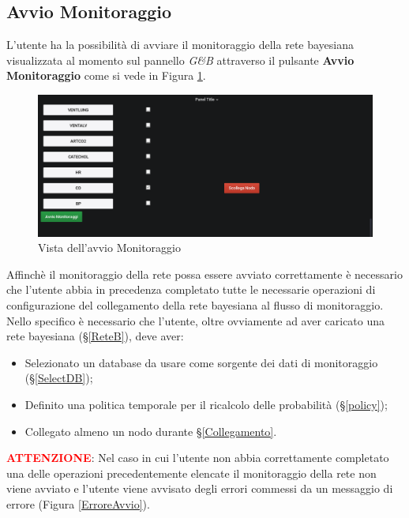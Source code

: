\subsection{Avvio Monitoraggio}\label{Avvio}

L'utente ha la possibilità di avviare il monitoraggio della rete bayesiana visualizzata al momento sul pannello \textit{G\&B} attraverso il pulsante \textbf{Avvio Monitoraggio} come si vede in Figura \ref{AvvioMonitoraggio}.

\begin{figure}[H]
	\begin{center}
		\includegraphics[scale=0.4]{./images/AvvioMonitoraggio.png}
		 \caption{Vista dell'avvio Monitoraggio}	
		 \label{AvvioMonitoraggio}
	\end{center}
\end{figure}

Affinchè il monitoraggio della rete possa essere avviato correttamente è necessario che l'utente abbia in precedenza completato tutte le necessarie operazioni di configurazione del collegamento della rete bayesiana al flusso di monitoraggio.\\
Nello specifico è necessario che l'utente, oltre ovviamente ad aver caricato una rete bayesiana (§\ref{ReteB}), deve aver:
\begin{itemize}
	\item Selezionato un database da usare come sorgente dei dati di monitoraggio (§\ref{SelectDB});
	\item Definito una politica temporale per il ricalcolo delle probabilità (§\ref{policy});
	\item Collegato almeno un nodo durante §\ref{Collegamento}.
\end{itemize} 

\pagebreak

\textbf{\textcolor{red}{ATTENZIONE}}: Nel caso in cui l'utente non abbia correttamente completato una delle operazioni precedentemente elencate il monitoraggio della rete non viene avviato e l'utente viene avvisato degli errori commessi da un messaggio di errore (Figura \ref{ErroreAvvio}).


